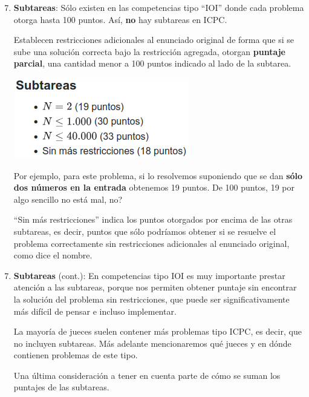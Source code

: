 \documentclass{beamer}
\begin{document}
    \begin{frame}[noframenumbering]
        \begin{enumerate}
            \setcounter{enumi}{6}
            \item \textbf{Subtareas}: Sólo existen en las competencias tipo ``IOI'' donde cada problema otorga hasta 100 puntos. Así, \textbf{no} hay subtareas en ICPC. \pause

                Establecen restricciones adicionales al enunciado original de forma que si se sube una solución correcta bajo la restricción agregada, otorgan \textbf{puntaje parcial}, una cantidad menor a 100 puntos indicado al lado de la subtarea. \pause

            \begin{center}
                \includegraphics[width=.4\linewidth]{./res/ou_subtasks.png}
            \end{center}\pause

            Por ejemplo, para este problema, si lo resolvemos suponiendo que se dan \textbf{sólo dos números en la entrada} obtenemos 19 puntos. \pause De 100 puntos, 19 por algo sencillo no está mal, no? \pause

            ``Sin más restricciones'' indica los puntos otorgados por encima de las otras subtareas, es decir, puntos que sólo podríamos obtener si se resuelve el problema correctamente sin restricciones adicionales al enunciado original, como dice el nombre.
        \end{enumerate}
    \end{frame}

    \begin{frame}[noframenumbering]
        \begin{enumerate}
            \setcounter{enumi}{6}
            \item \textbf{Subtareas} (cont.): En competencias tipo IOI es muy importante prestar atención a las subtareas, porque nos permiten obtener puntaje sin encontrar la solución del problema sin restricciones, que puede ser significativamente más difícil de pensar e incluso implementar. \pause \vspace{4pt}

            La mayoría de jueces suelen contener más problemas tipo ICPC, es decir, que no incluyen subtareas. Más adelante mencionaremos qué jueces y en dónde contienen problemas de este tipo. \pause \vspace{4pt}

            Una última consideración a tener en cuenta parte de cómo se suman los puntajes de las subtareas. 
        \end{enumerate}
    \end{frame}
\end{document}
